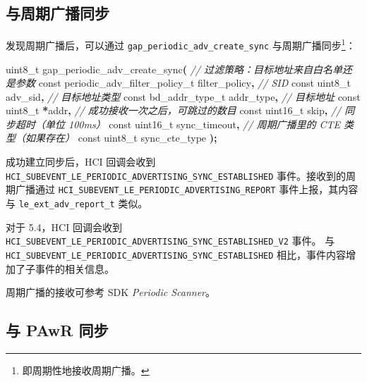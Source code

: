 \documentclass[
  12pt,
]{book}
\newenvironment{Shaded}{\begin{snugshade}}{\end{snugshade}}
\newcommand{\CommentTok}[1]{\textcolor[rgb]{0.56,0.35,0.01}{\textit{#1}}}
\newcommand{\DataTypeTok}[1]{\textcolor[rgb]{0.13,0.29,0.53}{#1}}
\newcommand{\NormalTok}[1]{#1}
\newcommand{\OperatorTok}[1]{\textcolor[rgb]{0.81,0.36,0.00}{\textbf{#1}}}
\begin{document}
\hypertarget{ux4e0eux5468ux671fux5e7fux64adux540cux6b65}{%
\subsection{与周期广播同步}\label{ux4e0eux5468ux671fux5e7fux64adux540cux6b65}}

发现周期广播后，可以通过 \texttt{gap\_periodic\_adv\_create\_sync} 与周期广播同步\footnote{即周期性地接收周期广播。}：

\begin{Shaded}
\begin{Highlighting}[]
\DataTypeTok{uint8\_t}\NormalTok{ gap\_periodic\_adv\_create\_sync}\OperatorTok{(}
  \CommentTok{// 过滤策略：目标地址来自白名单还是参数}
  \DataTypeTok{const}\NormalTok{ periodic\_adv\_filter\_policy\_t filter\_policy}\OperatorTok{,}
  \CommentTok{// SID}
  \DataTypeTok{const} \DataTypeTok{uint8\_t}\NormalTok{ adv\_sid}\OperatorTok{,}
  \CommentTok{// 目标地址类型}
  \DataTypeTok{const}\NormalTok{ bd\_addr\_type\_t addr\_type}\OperatorTok{,}
  \CommentTok{// 目标地址}
  \DataTypeTok{const} \DataTypeTok{uint8\_t} \OperatorTok{*}\NormalTok{addr}\OperatorTok{,}
  \CommentTok{// 成功接收一次之后，可跳过的数目}
  \DataTypeTok{const} \DataTypeTok{uint16\_t}\NormalTok{ skip}\OperatorTok{,}
  \CommentTok{// 同步超时（单位 100ms）}
  \DataTypeTok{const} \DataTypeTok{uint16\_t}\NormalTok{ sync\_timeout}\OperatorTok{,}
  \CommentTok{// 周期广播里的 CTE 类型（如果存在）}
  \DataTypeTok{const} \DataTypeTok{uint8\_t}\NormalTok{ sync\_cte\_type}
\OperatorTok{);}
\end{Highlighting}
\end{Shaded}

成功建立同步后，HCI 回调会收到 \texttt{HCI\_SUBEVENT\_LE\_PERIODIC\_ADVERTISING\_SYNC\_ESTABLISHED} 事件。接收到的周期广播通过
\texttt{HCI\_SUBEVENT\_LE\_PERIODIC\_ADVERTISING\_REPORT} 事件上报，其内容与 \texttt{le\_ext\_adv\_report\_t} 类似。

对于 5.4，HCI 回调会收到 \texttt{HCI\_SUBEVENT\_LE\_PERIODIC\_ADVERTISING\_SYNC\_ESTABLISHED\_V2} 事件。
与 \texttt{HCI\_SUBEVENT\_LE\_PERIODIC\_ADVERTISING\_SYNC\_ESTABLISHED} 相比，事件内容增加了子事件的相关信息。

周期广播的接收可参考 SDK \emph{Periodic Scanner}。

\hypertarget{ux4e0e-pawr-ux540cux6b65}{%
\subsection{与 PAwR 同步}\label{ux4e0e-pawr-ux540cux6b65}}
\end{document}
